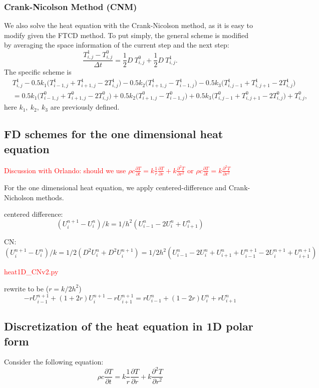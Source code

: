 \documentclass[12pt]{article}
\begin{document}
\subsubsection{Crank-Nicolson Method (CNM)}
We also solve the heat equation with the Crank-Nicolson method, as it is easy to modify given the FTCD method. To put simply, the general scheme is modified by averaging the space information of the current step and the next step:
\begin{equation}
\frac{T^1_{i,j}-T^0_{i,j}}{\Delta t}=\frac{1}{2}D\ T^0_{i,j}+\frac{1}{2}D\ T^1_{i,j}.
\end{equation}
The specific scheme is 
\begin{align}
& T^1_{i,j}-0.5k_1\bigg(T^1_{i-1,j}+T^1_{i+1,j}-2T^1_{i,j}\bigg)-0.5k_2\bigg(T^1_{i+1,j}-T^1_{i-1,j}\bigg)
-0.5k_3\bigg(T^1_{i,j-1}+T^1_{i,j+1}-2T^1_{i,j}\bigg)\nonumber\\
&= 0.5k_1\bigg(T^0_{i-1,j}+T^0_{i+1,j}-2T^0_{i,j}\bigg)+0.5k_2\bigg(T^0_{i+1,j}-T^0_{i-1,j}\bigg)
+0.5k_3\bigg(T^0_{i,j-1}+T^0_{i,j+1}-2T^0_{i,j}\bigg)+T^0_{i,j},
\end{align}
here $k_1,\ k_2,\ k_3$ are previously defined. 

\subsection{FD schemes for the one dimensional heat equation}

\textcolor{red}{Discussion with Orlando: should we use $\rho c\frac{\partial T}{\partial t}=k\frac{1}{r}\frac{\partial T}{\partial r}+k\frac{\partial^2T}{\partial r^2}$ or $\rho c\frac{\partial T}{\partial t}=k\frac{\partial^2T}{\partial r^2}$}

For the one dimensional heat equation, we apply centered-difference and Crank-Nicholson methods. 

centered difference:
$$(U^{n+1}_i - U^n_i)/k = 1/h^2 (U^n_{i-1} - 2U^n_i + U^n_{i+1})$$

CN:
$$(U^{n+1}_i - U^n_i)/k = 1/2 (D^2U^n_i + D^2U^{n+1}_i) 
=1/2h^2(U^n_{i-1} - 2U^n_i + U^n_{i+1} + U^{n+1}_{i-1} - 2U^{n+1}_i + U^{n+1}_{i+1})$$  

\textcolor{red}{heat1D\_CNv2.py} 

rewrite to be ($r=k/2h^2$)
$$-r U^{n+1}_{i-1} + (1+2r) U^{n+1}_i - r U^{n+1}_{i+1} = 
r U^n_{i-1} + (1-2r) U^n_i + r U^n_{i+1}$$

\subsection{Discretization of the heat equation in 1D polar form}
Consider the following equation:
$$\rho c\frac{\partial T}{\partial t}=k\frac{1}{r}\frac{\partial T}{\partial r}+k\frac{\partial^2T}{\partial r^2}$$
\end{document}
